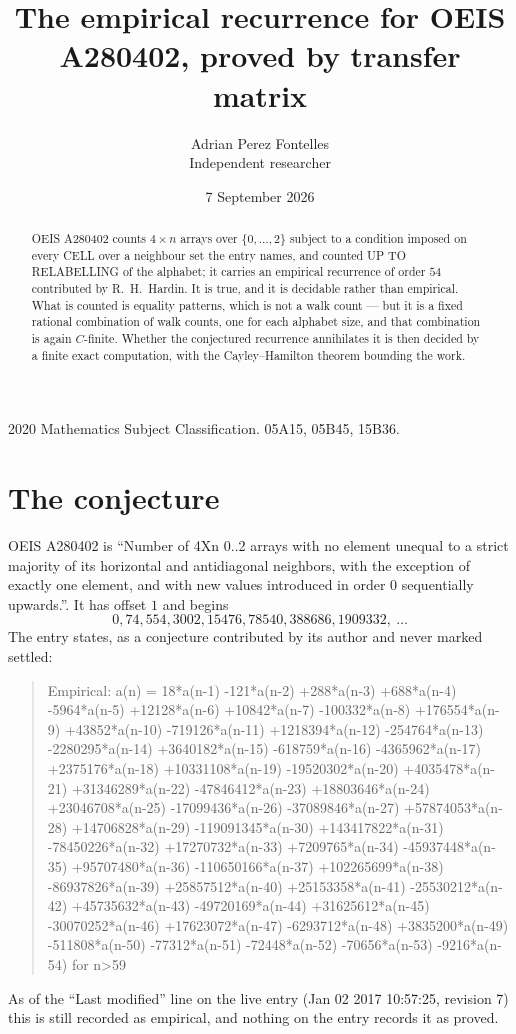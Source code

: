\documentclass[11pt,a4paper]{article}
\title{The empirical recurrence for OEIS A280402, proved by transfer matrix}
\author{Adrian Perez Fontelles\\ \small Independent researcher}
\date{7 September 2026}
\theoremstyle{plain}
\theoremstyle{definition}
\begin{document}
\maketitle

\begin{abstract}
OEIS A280402 counts $4\times n$ arrays over $\{0,\dots,2\}$ subject to a condition imposed on
every CELL over a neighbour set the entry names, and counted UP TO RELABELLING of the
alphabet; it carries an empirical recurrence of order $54$ contributed by
R.~H.~Hardin. It is true, and it is decidable rather than empirical. What is counted is
equality patterns, which is not a walk count --- but it is a fixed rational combination of
walk counts, one for each alphabet size, and that combination is again $C$-finite. Whether the
conjectured recurrence annihilates it is then decided by a finite exact computation, with the
Cayley--Hamilton theorem bounding the work.
\end{abstract}

\noindent\small 2020 Mathematics Subject Classification. 05A15, 05B45, 15B36.\normalsize

\section{The conjecture}

OEIS A280402 is ``Number of 4Xn 0..2 arrays with no element unequal to a strict majority of its horizontal and antidiagonal neighbors, with the exception of exactly one element, and with new values introduced in order 0 sequentially upwards.''. It has offset $1$ and begins
\[
0, 74, 554, 3002, 15476, 78540, 388686, 1909332,\ \dots
\]
The entry states, as a conjecture contributed by its author and never marked settled:
\begin{quote}
Empirical: a(n) = 18*a(n-1) -121*a(n-2) +288*a(n-3) +688*a(n-4) -5964*a(n-5) +12128*a(n-6) +10842*a(n-7) -100332*a(n-8) +176554*a(n-9) +43852*a(n-10) -719126*a(n-11) +1218394*a(n-12) -254764*a(n-13) -2280295*a(n-14) +3640182*a(n-15) -618759*a(n-16) -4365962*a(n-17) +2375176*a(n-18) +10331108*a(n-19) -19520302*a(n-20) +4035478*a(n-21) +31346289*a(n-22) -47846412*a(n-23) +18803646*a(n-24) +23046708*a(n-25) -17099436*a(n-26) -37089846*a(n-27) +57874053*a(n-28) +14706828*a(n-29) -119091345*a(n-30) +143417822*a(n-31) -78450226*a(n-32) +17270732*a(n-33) +7209765*a(n-34) -45937448*a(n-35) +95707480*a(n-36) -110650166*a(n-37) +102265699*a(n-38) -86937826*a(n-39) +25857512*a(n-40) +25153358*a(n-41) -25530212*a(n-42) +45735632*a(n-43) -49720169*a(n-44) +31625612*a(n-45) -30070252*a(n-46) +17623072*a(n-47) -6293712*a(n-48) +3835200*a(n-49) -511808*a(n-50) -77312*a(n-51) -72448*a(n-52) -70656*a(n-53) -9216*a(n-54) for n>59
\end{quote}
As of the ``Last modified'' line on the live entry (Jan 02 2017 10:57:25, revision 7) this is still
recorded as empirical, and nothing on the entry records it as proved.
\end{document}
